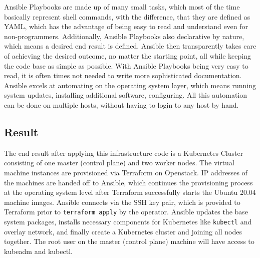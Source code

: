 \noindent
Ansible Playbooks are made up of many small tasks, which most of the time basically
represent shell commands, with the difference, that they are defined as YAML,
which has the advantage of being easy to read and understand even for non-programmers.
Additionally, Ansible Playbooks also declarative by nature, which means a desired end result 
is defined. Ansible then transparently takes care of achieving the desired outcome,
no matter the starting point, all while keeping the code base as simple as possible.
With Ansible Playbooks being very easy to read, it is often times not needed to write 
more sophisticated documentation.
Ansible excels at automating on the operating system layer,
which means running system updates, installing additional software,
configuring. All this automation can be done on multiple hosts, without 
having to login to any host by hand. 

\subsection{Result}
The end result after applying this infrastructure code is a 
Kubernetes Cluster consisting of one master (control plane) and two worker nodes.
The virtual machine instances are provisioned via
Terraform on Openstack. IP addresses of the machines are handed off to Ansible, which continues
the provisioning process at the operating system level
after Terraform successfully starts the Ubuntu 20.04 machine images.
Ansible connects via the SSH key pair, which is provided to 
Terraform prior to \verb|terraform apply| by the operator.
Ansible updates the base system packages, installs necessary
components for Kubernetes like \verb|kubectl| and overlay network,
and finally create a Kubernetes cluster and joining all nodes together.
The root user on the master (control plane) machine will have access to
kubeadm and kubectl.





